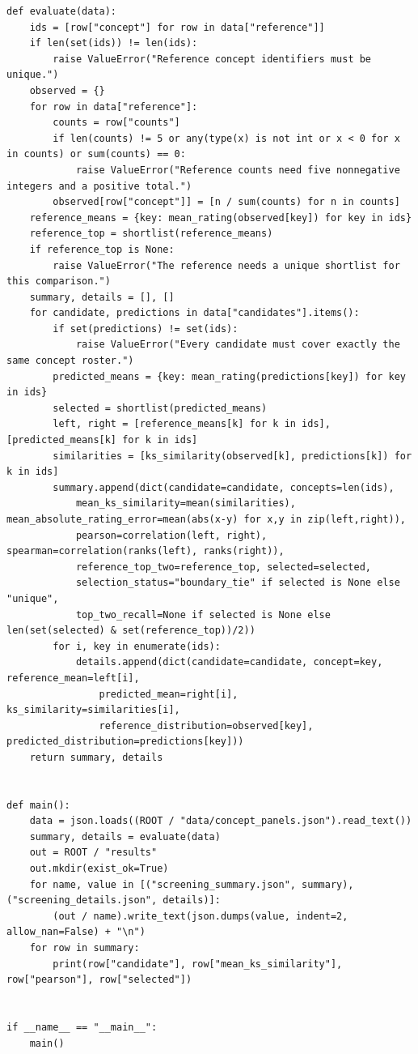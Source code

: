 \begin{Verbatim}[breaklines,breakanywhere,fontsize=\small]
def evaluate(data):
    ids = [row["concept"] for row in data["reference"]]
    if len(set(ids)) != len(ids):
        raise ValueError("Reference concept identifiers must be unique.")
    observed = {}
    for row in data["reference"]:
        counts = row["counts"]
        if len(counts) != 5 or any(type(x) is not int or x < 0 for x in counts) or sum(counts) == 0:
            raise ValueError("Reference counts need five nonnegative integers and a positive total.")
        observed[row["concept"]] = [n / sum(counts) for n in counts]
    reference_means = {key: mean_rating(observed[key]) for key in ids}
    reference_top = shortlist(reference_means)
    if reference_top is None:
        raise ValueError("The reference needs a unique shortlist for this comparison.")
    summary, details = [], []
    for candidate, predictions in data["candidates"].items():
        if set(predictions) != set(ids):
            raise ValueError("Every candidate must cover exactly the same concept roster.")
        predicted_means = {key: mean_rating(predictions[key]) for key in ids}
        selected = shortlist(predicted_means)
        left, right = [reference_means[k] for k in ids], [predicted_means[k] for k in ids]
        similarities = [ks_similarity(observed[k], predictions[k]) for k in ids]
        summary.append(dict(candidate=candidate, concepts=len(ids),
            mean_ks_similarity=mean(similarities), mean_absolute_rating_error=mean(abs(x-y) for x,y in zip(left,right)),
            pearson=correlation(left, right), spearman=correlation(ranks(left), ranks(right)),
            reference_top_two=reference_top, selected=selected,
            selection_status="boundary_tie" if selected is None else "unique",
            top_two_recall=None if selected is None else len(set(selected) & set(reference_top))/2))
        for i, key in enumerate(ids):
            details.append(dict(candidate=candidate, concept=key, reference_mean=left[i],
                predicted_mean=right[i], ks_similarity=similarities[i],
                reference_distribution=observed[key], predicted_distribution=predictions[key]))
    return summary, details


def main():
    data = json.loads((ROOT / "data/concept_panels.json").read_text())
    summary, details = evaluate(data)
    out = ROOT / "results"
    out.mkdir(exist_ok=True)
    for name, value in [("screening_summary.json", summary), ("screening_details.json", details)]:
        (out / name).write_text(json.dumps(value, indent=2, allow_nan=False) + "\n")
    for row in summary:
        print(row["candidate"], row["mean_ks_similarity"], row["pearson"], row["selected"])


if __name__ == "__main__":
    main()
\end{Verbatim}

